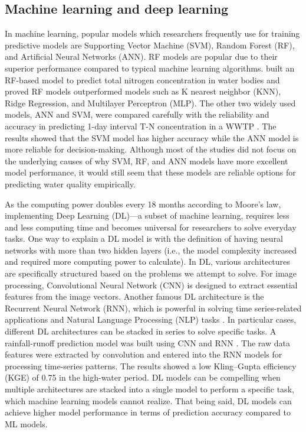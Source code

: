 \subsection{Machine learning and deep learning}
In machine learning, popular models which researchers frequently use for training predictive models are Supporting Vector Machine (SVM), Random Forest (RF), and Artificial Neural Networks (ANN). RF models are popular due to their superior performance compared to typical machine learning algorithms.  \citet{xuAlternativeLaboratoryTesting2021} built an RF-based model to predict total nitrogen concentration in water bodies and proved RF models outperformed models such as K nearest neighbor (KNN), Ridge Regression, and Multilayer Perceptron (MLP). The other two widely used models, ANN and SVM, were compared carefully with the reliability and accuracy in predicting 1-day interval T-N concentration in a WWTP \citep{guoPredictionEffluentConcentration2015}. The results showed that the SVM model has higher accuracy while the ANN model is more reliable for decision-making. Although most of the studies did not focus on the underlying causes of why SVM, RF, and ANN models have more excellent model performance, it would still seem that these models are reliable options for predicting water quality empirically.

As the computing power doubles every 18 months according to Moore's law, implementing Deep Learning (DL)---a subset of machine learning, requires less and less computing time and becomes universal for researchers to solve everyday tasks. One way to explain a DL model is with the definition of having neural networks with more than two hidden layers (i.e., the model complexity increased and required more computing power to calculate). In DL, various architectures are specifically structured based on the problems we attempt to solve. For image processing, Convolutional Neural Network (CNN) is designed to extract essential features from the image vectors. Another famous DL architecture is the Recurrent Neural Network (RNN), which is powerful in solving time series-related applications and Natural Language Processing (NLP) tasks \citep{liERNNDesignOptimization2018}. In particular cases, different DL architectures can be stacked in series to solve specific tasks. A rainfall-runoff prediction model was built using CNN and RNN \citep{liPredictionFlowBased2022}. The raw data features were extracted by convolution and entered into the RNN models for processing time-series patterns. The results showed a low Kling–Gupta efficiency (KGE) of 0.75 in the high-water period. DL models can be compelling when multiple architectures are stacked into a single model to perform a specific task, which machine learning models cannot realize. That being said, DL models can achieve higher model performance in terms of prediction accuracy compared to ML models. 

